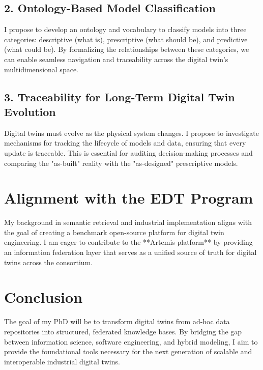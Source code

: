 \documentclass[a4paper,11pt]{article}
\begin{document}
\subsection{2. Ontology-Based Model Classification}
I propose to develop an ontology and vocabulary to classify models into three categories: descriptive (what is), prescriptive (what should be), and predictive (what could be). By formalizing the relationships between these categories, we can enable seamless navigation and traceability across the digital twin's multidimensional space.

\subsection{3. Traceability for Long-Term Digital Twin Evolution}
Digital twins must evolve as the physical system changes. I propose to investigate mechanisms for tracking the lifecycle of models and data, ensuring that every update is traceable. This is essential for auditing decision-making processes and comparing the "as-built" reality with the "as-designed" prescriptive models.

\section{Alignment with the EDT Program}
My background in semantic retrieval and industrial implementation aligns with the goal of creating a benchmark open-source platform for digital twin engineering. I am eager to contribute to the **Artemis platform** by providing an information federation layer that serves as a unified source of truth for digital twins across the consortium.

\section{Conclusion}
The goal of my PhD will be to transform digital twins from ad-hoc data repositories into structured, federated knowledge bases. By bridging the gap between information science, software engineering, and hybrid modeling, I aim to provide the foundational tools necessary for the next generation of scalable and interoperable industrial digital twins.
\end{document}
